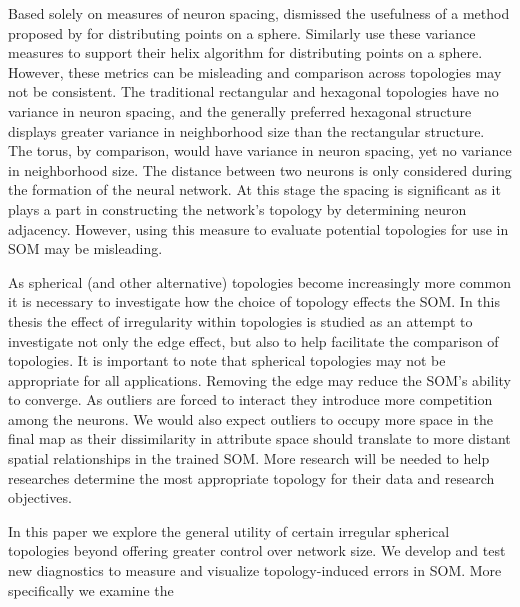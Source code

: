 Based solely on measures of neuron spacing, \cite{wu2005} dismissed the usefulness of a method
proposed by \cite{Rakhmanov94} for distributing points on a sphere.  Similarly
\cite{Nishio:2006fk} use these variance measures to support their helix
algorithm for distributing points on a sphere.  However,
these metrics can be misleading and comparison across topologies may not be
consistent.  The traditional rectangular and hexagonal topologies have no
variance in neuron spacing, and the generally preferred hexagonal structure
displays greater variance in neighborhood size than the rectangular structure.
The torus, by comparison, would have variance in neuron spacing, yet no
variance in neighborhood size.  The distance between two neurons is only
considered during the formation of the neural network.  At this stage the
spacing is significant as it plays a part in constructing the network's
topology by determining neuron adjacency.  However, using this measure to
evaluate potential topologies for use in SOM may be misleading.

As spherical (and other alternative) topologies become
increasingly more common it is necessary to investigate how the choice of
topology effects the SOM.  In this thesis the effect of irregularity within
topologies is studied as an attempt to investigate not only the edge effect,
but also to help facilitate the comparison of topologies.  It is important to
note that spherical topologies may not be appropriate for all applications.
Removing the edge may reduce the SOM's ability to converge.  As outliers are
forced to interact they introduce more competition among the neurons.  We
would also expect outliers to occupy more space in the final map as their
dissimilarity in attribute space should translate to more distant spatial
relationships in the trained SOM.  More research will be needed to help researches
determine the most appropriate topology for their data and research objectives.

In this paper we explore the general utility of certain irregular spherical
topologies beyond offering greater control over network size. We develop and
test new diagnostics to measure and visualize topology-induced errors in SOM.
More specifically we examine the


